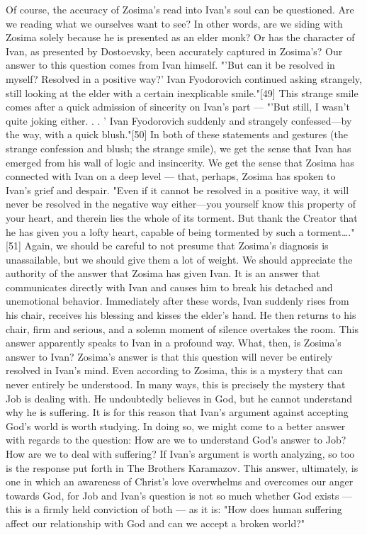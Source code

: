 Of course, the accuracy of Zosima's read into Ivan's soul can be questioned. Are we reading what we ourselves want to see? In other words, are we siding with Zosima solely because he is presented as an elder monk? Or has the character of Ivan, as presented by Dostoevsky, been accurately captured in Zosima's? Our answer to this question comes from Ivan himself. "'But can it be resolved in myself? Resolved in a positive way?' Ivan Fyodorovich continued asking strangely, still looking at the elder with a certain inexplicable smile."[49] This strange smile comes after a quick admission of sincerity on Ivan's part — "'But still, I wasn't quite joking either. . . ' Ivan Fyodorovich suddenly and strangely confessed—by the way, with a quick blush."[50] In both of these statements and gestures (the strange confession and blush; the strange smile), we get the sense that Ivan has emerged from his wall of logic and insincerity. We get the sense that Zosima has connected with Ivan on a deep level — that, perhaps, Zosima has spoken to Ivan's grief and despair.
"Even if it cannot be resolved in a positive way, it will never be resolved in the negative way either—you yourself know this property of your heart, and therein lies the whole of its torment. But thank the Creator that he has given you a lofty heart, capable of being tormented by such a torment…."[51] Again, we should be careful to not presume that Zosima's diagnosis is unassailable, but we should give them a lot of weight. We should appreciate the authority of the answer that Zosima has given Ivan. It is an answer that communicates directly with Ivan and causes him to break his detached and unemotional behavior. Immediately after these words, Ivan suddenly rises from his chair, receives his blessing and kisses the elder's hand. He then returns to his chair, firm and serious, and a solemn moment of silence overtakes the room. This answer apparently speaks to Ivan in a profound way.
What, then, is Zosima's answer to Ivan? Zosima's answer is that this question will never be entirely resolved in Ivan's mind. Even according to Zosima, this is a mystery that can never entirely be understood. In many ways, this is precisely the mystery that Job is dealing with. He undoubtedly believes in God, but he cannot understand why he is suffering. It is for this reason that Ivan's argument against accepting God's world is worth studying. In doing so, we might come to a better answer with regards to the question: How are we to understand God's answer to Job? How are we to deal with suffering? If Ivan's argument is worth analyzing, so too is the response put forth in The Brothers Karamazov. This answer, ultimately, is one in which an awareness of Christ's love overwhelms and overcomes our anger towards God, for Job and Ivan's question is not so much whether God exists — this is a firmly held conviction of both — as it is: "How does human suffering affect our relationship with God and can we accept a broken world?"        
